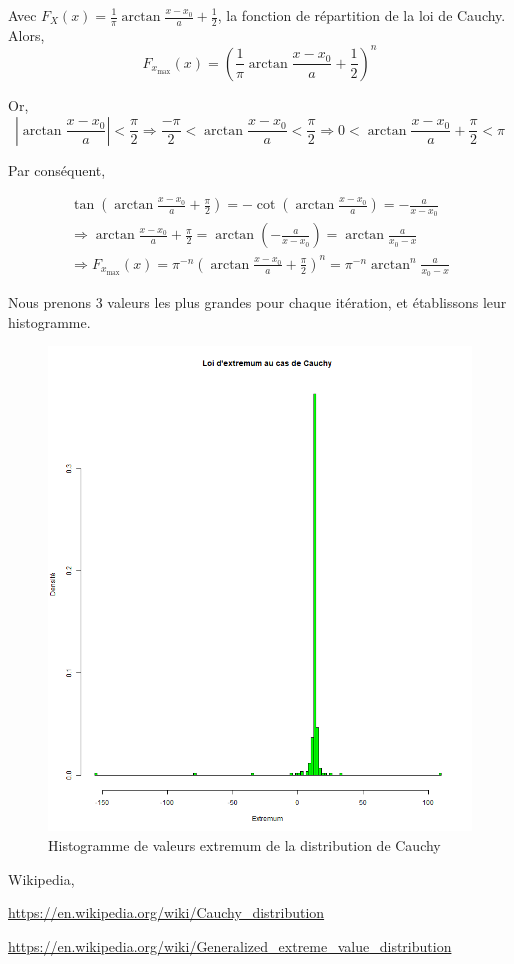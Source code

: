 \documentclass[12pt,a4paper,titlepage]{article}
\numberwithin{equation}{section}
\begin{document}
Avec ${F_X}\left( x \right) = \frac{1}{\pi }\arctan \frac{{x - {x_0}}}{a} + \frac{1}{2}$, la fonction de répartition de la loi de Cauchy. Alors, \[{F_{{x_{\max }}}}\left( x \right) = {\left( {\frac{1}{\pi }\arctan \frac{{x - {x_0}}}{a} + \frac{1}{2}} \right)^n}\]

Or, \[\left| {\arctan \frac{{x - {x_0}}}{a}} \right| < \frac{\pi }{2} \Rightarrow \frac{{ - \pi }}{2} < \arctan \frac{{x - {x_0}}}{a} < \frac{\pi }{2} \Rightarrow 0 < \arctan \frac{{x - {x_0}}}{a} + \frac{\pi }{2} < \pi \]

Par conséquent,

\[\begin{array}{l}
\tan \left( {\arctan \frac{{x - {x_0}}}{a} + \frac{\pi }{2}} \right) =  - \cot \left( {\arctan \frac{{x - {x_0}}}{a}} \right) =  - \frac{a}{{x - {x_0}}}\\
 \Rightarrow \arctan \frac{{x - {x_0}}}{a} + \frac{\pi }{2} = \arctan \left( { - \frac{a}{{x - {x_0}}}} \right) = \arctan \frac{a}{{{x_0} - x}}\\
 \Rightarrow {F_{{x_{\max }}}}\left( x \right) = {\pi ^{ - n}}{\left( {\arctan \frac{{x - {x_0}}}{a} + \frac{\pi }{2}} \right)^n} = {\pi ^{ - n}}{\arctan ^n}\frac{a}{{{x_0} - x}}
\end{array}\]

Nous prenons 3 valeurs les plus grandes pour chaque itération, et établissons leur histogramme.



\begin{figure}[!h]
\centering
\includegraphics[width=0.8\linewidth]{images/Cauchy_extremum.png}
\caption{Histogramme de valeurs extremum de la distribution de Cauchy}
\end{figure}


\clearpage

\begin{thebibliography}{3}

Wikipedia,

\url{https://en.wikipedia.org/wiki/Cauchy_distribution}

\url{https://en.wikipedia.org/wiki/Generalized_extreme_value_distribution}

\end{thebibliography}
\end{document}
